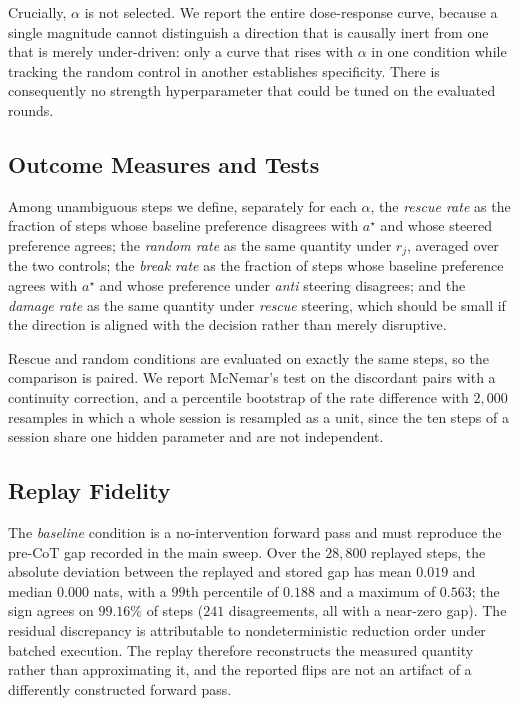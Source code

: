 Crucially, \(\alpha\) is not selected. We report the entire dose-response curve,
because a single magnitude cannot distinguish a direction that is causally inert
from one that is merely under-driven: only a curve that rises with \(\alpha\) in
one condition while tracking the random control in another establishes
specificity. There is consequently no strength hyperparameter that could be
tuned on the evaluated rounds.

\subsection{Outcome Measures and Tests}

Among unambiguous steps we define, separately for each \(\alpha\),
the \emph{rescue rate} as the fraction of steps whose baseline preference
disagrees with \(a^\star\) and whose steered preference agrees;
the \emph{random rate} as the same quantity under \(r_j\), averaged over the two
controls; the \emph{break rate} as the fraction of steps whose baseline
preference agrees with \(a^\star\) and whose preference under \emph{anti}
steering disagrees; and the \emph{damage rate} as the same quantity under
\emph{rescue} steering, which should be small if the direction is aligned with
the decision rather than merely disruptive.

Rescue and random conditions are evaluated on exactly the same steps, so the
comparison is paired. We report McNemar's test on the discordant pairs with a
continuity correction, and a percentile bootstrap of the rate difference with
\(2{,}000\) resamples in which a whole session is resampled as a unit, since the
ten steps of a session share one hidden parameter and are not independent.

\subsection{Replay Fidelity}

The \emph{baseline} condition is a no-intervention forward pass and must
reproduce the pre-CoT gap recorded in the main sweep. Over the \(28{,}800\)
replayed steps, the absolute deviation between the replayed and stored gap has
mean \(0.019\) and median \(0.000\) nats, with a \(99\)th percentile of
\(0.188\) and a maximum of \(0.563\); the sign agrees on \(99.16\%\) of steps
(\(241\) disagreements, all with a near-zero gap). The residual discrepancy is
attributable to nondeterministic reduction order under batched execution. The
replay therefore reconstructs the measured quantity rather than approximating
it, and the reported flips are not an artifact of a differently constructed
forward pass.

